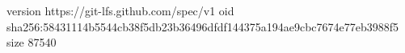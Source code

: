 version https://git-lfs.github.com/spec/v1
oid sha256:58431114b5544cb38f5db23b36496dfdf144375a194ae9cbc7674e77eb3988f5
size 87540

